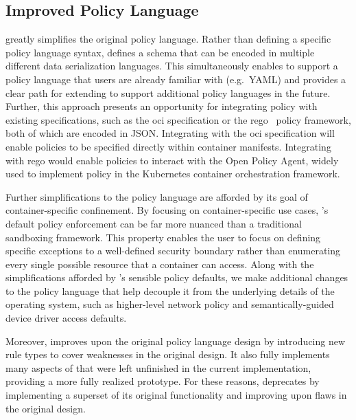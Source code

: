 \subsection{Improved Policy Language}%
\label{ss:bpfcontain-simplified}

\bpfcontain{} greatly simplifies the original \bpfbox{} policy language. Rather than
defining a specific policy language syntax, \bpfcontain{} defines a schema that can be
encoded in multiple different data serialization languages.  This simultaneously enables
\bpfcontain{} to support a policy language that users are already familiar with (e.g.\ YAML)
and provides a clear path for extending \bpfcontain{} to support additional policy
languages in the future. Further, this approach presents an opportunity for integrating
\bpfcontain{} policy with existing specifications, such as the \gls{oci} specification or
the rego~\cite{rego} policy framework, both of which are encoded in JSON\@. Integrating
with the \gls{oci} specification will enable \bpfcontain{} policies to be specified
directly within container manifests. Integrating with rego would enable \bpfcontain{}
policies to interact with the Open Policy Agent, widely used to implement policy in the
Kubernetes container orchestration framework.

Further simplifications to the \bpfcontain{} policy language are afforded by its goal of
container-specific confinement. By focusing on container-specific use cases,
\bpfcontain{}'s default policy enforcement can be far more nuanced than a traditional
sandboxing framework. This property enables the user to focus on defining specific
exceptions to a well-defined security boundary rather than enumerating every single
possible resource that a container can access. Along with the simplifications afforded by
\bpfcontain{}'s sensible policy defaults, we make additional changes to the policy
language that help decouple it from the underlying details of the operating system, such
as higher-level network policy and semantically-guided device driver access defaults.

Moreover, \bpfcontain{} improves upon the original \bpfbox{} policy language design by
introducing new rule types to cover weaknesses in the original design. It also fully
implements many aspects of \bpfbox{} that were left unfinished in the current
implementation, providing a more fully realized prototype. For these reasons,
\bpfcontain{} deprecates \bpfbox{} by implementing a superset of its original
functionality and improving upon flaws in the original \bpfbox{} design.

